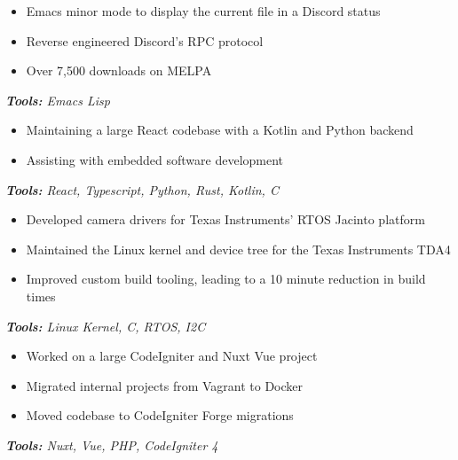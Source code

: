 \documentclass[10pt,letter]{altacv}
\begin{document}
\divider

\begin{itemize}
\item Emacs minor mode to display the current file in a Discord status
\item Reverse engineered Discord's RPC protocol
\item Over 7,500 downloads on MELPA
\end{itemize}
\textit{\textbf{Tools:} Emacs Lisp}

\smallskip


\begin{itemize}
  \item Maintaining a large React codebase with a Kotlin and Python backend
  \item Assisting with embedded software development
\end{itemize}
\textit{\textbf{Tools:} React, Typescript, Python, Rust, Kotlin, C}

\divider

\begin{itemize}
  \item Developed camera drivers for Texas Instruments' RTOS Jacinto platform
  \item Maintained the Linux kernel and device tree for the Texas Instruments TDA4
  \item Improved custom build tooling, leading to a 10 minute reduction in build times
\end{itemize}
\textit{\textbf{Tools:} Linux Kernel, C, RTOS, I2C}

\divider

\begin{itemize}
  \item Worked on a large CodeIgniter and Nuxt Vue project
  \item Migrated internal projects from Vagrant to Docker
  \item Moved codebase to CodeIgniter Forge migrations
\end{itemize}
\textit{\textbf{Tools:} Nuxt, Vue, PHP, CodeIgniter 4}

\clearpage
\end{document}
